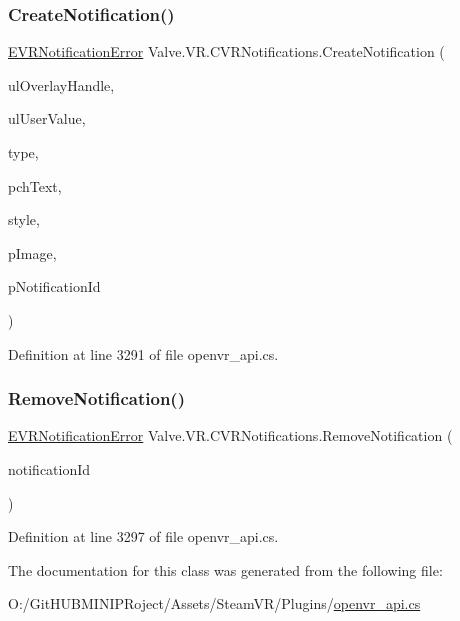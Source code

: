 \subsubsection{\texorpdfstring{CreateNotification()}{CreateNotification()}}
{\footnotesize\ttfamily \mbox{\hyperlink{namespace_valve_1_1_v_r_a9cf788def226e718d9ea88fd55c55646}{E\+V\+R\+Notification\+Error}} Valve.\+V\+R.\+C\+V\+R\+Notifications.\+Create\+Notification (\begin{DoxyParamCaption}\item[{ulong}]{ul\+Overlay\+Handle,  }\item[{ulong}]{ul\+User\+Value,  }\item[{\mbox{\hyperlink{namespace_valve_1_1_v_r_a8401e5b24b0e324a8dd57fe55b00fc65}{E\+V\+R\+Notification\+Type}}}]{type,  }\item[{string}]{pch\+Text,  }\item[{\mbox{\hyperlink{namespace_valve_1_1_v_r_a63b67bb250f81d54e3d3839945bb29da}{E\+V\+R\+Notification\+Style}}}]{style,  }\item[{ref \mbox{\hyperlink{struct_valve_1_1_v_r_1_1_notification_bitmap__t}{Notification\+Bitmap\+\_\+t}}}]{p\+Image,  }\item[{ref uint}]{p\+Notification\+Id }\end{DoxyParamCaption})}



Definition at line 3291 of file openvr\+\_\+api.\+cs.

\mbox{\label{class_valve_1_1_v_r_1_1_c_v_r_notifications_a271130f93a5d32164a252dcd4d1edb27}} 
\subsubsection{\texorpdfstring{RemoveNotification()}{RemoveNotification()}}
{\footnotesize\ttfamily \mbox{\hyperlink{namespace_valve_1_1_v_r_a9cf788def226e718d9ea88fd55c55646}{E\+V\+R\+Notification\+Error}} Valve.\+V\+R.\+C\+V\+R\+Notifications.\+Remove\+Notification (\begin{DoxyParamCaption}\item[{uint}]{notification\+Id }\end{DoxyParamCaption})}



Definition at line 3297 of file openvr\+\_\+api.\+cs.



The documentation for this class was generated from the following file\+:\begin{DoxyCompactItemize}
\item 
O\+:/\+Git\+H\+U\+B\+M\+I\+N\+I\+P\+Roject/\+Assets/\+Steam\+V\+R/\+Plugins/\mbox{\hyperlink{openvr__api_8cs}{openvr\+\_\+api.\+cs}}\end{DoxyCompactItemize}

